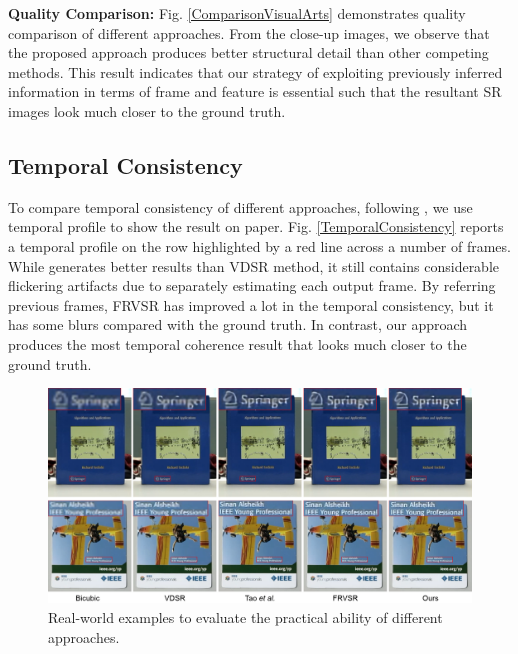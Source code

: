 \documentclass[letterpaper]{article} %
\begin{document}
\textbf{Quality Comparison:} Fig. \ref{ComparisonVisualArts} demonstrates quality comparison of different approaches. From the close-up images, we observe that the proposed approach produces better structural detail than other competing methods. This result indicates that our strategy of exploiting previously inferred information in terms of frame and feature is essential such that the resultant SR images look much closer to the ground truth.



\subsection{Temporal Consistency}

To compare temporal consistency of different approaches, following \cite{VESPCN2017cvpr}, we use temporal profile to show the result on paper. Fig. \ref{TemporalConsistency} reports a temporal profile on the row highlighted by a red line across a number of frames. While \cite{Tao2017iccv} generates better results than VDSR method, it still contains considerable flickering artifacts due to separately estimating each output frame. By referring previous frames, FRVSR has improved a lot in the temporal consistency, but it has some blurs compared with the ground truth. In contrast, our approach produces the most temporal coherence result that looks much closer to the ground truth.



\begin{figure}[t]
\centering
\includegraphics[width=8 cm]{Fig9.png}
\caption{Real-world examples to evaluate the practical ability of different approaches.}
\label{RealWorldExamples}
\end{figure}
\end{document}
